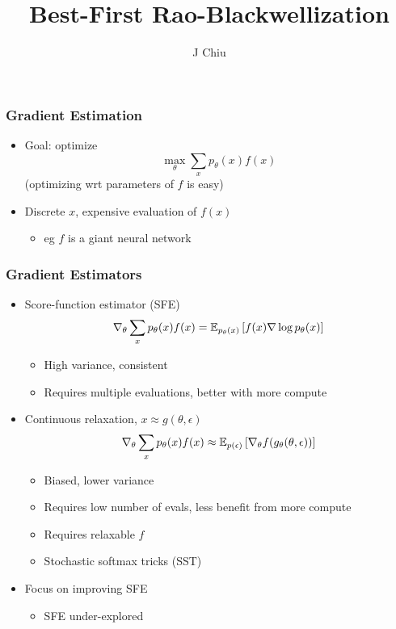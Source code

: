\documentclass{beamer}
\title{Best-First Rao-Blackwellization}
\author{J Chiu}
\begin{document}
\begin{frame}[plain]
\titlepage
\end{frame}

\begin{frame}
\frametitle{Gradient Estimation}
\begin{itemize}
\item Goal: optimize
$$\max_\theta \sum_x p_\theta(x)f(x)$$
(optimizing wrt parameters of $f$ is easy)
\item Discrete $x$, expensive evaluation of $f(x)$
    \begin{itemize}
    \item eg $f$ is a giant neural network
    \end{itemize}
\end{itemize}
\end{frame}

\begin{frame}
\frametitle{Gradient Estimators}
\begin{itemize}
\item Score-function estimator (SFE)
    $$\nabla_\theta \sum_x p_\theta(x)f(x)
    = \mathbb{E}_{p_\theta(x)}\left[f(x)\nabla \log p_\theta(x)\right]$$
    \begin{itemize}
    \item High variance, consistent
    \item Requires multiple evaluations, better with more compute
    \end{itemize}
\item Continuous relaxation, $x \approx g(\theta, \epsilon)$
    $$\nabla_\theta \sum_x p_\theta(x)f(x)
    \approx \mathbb{E}_{p(\epsilon)}\left[\nabla_\theta f(g_\theta(\theta, \epsilon))\right]$$
    \begin{itemize}
    \item Biased, lower variance
    \item Requires low number of evals, less benefit from more compute
    \item Requires relaxable $f$
    \item Stochastic softmax tricks (SST)
    \end{itemize}
\item Focus on improving SFE
    \begin{itemize}
    \item SFE under-explored
    \end{itemize}
\end{itemize}
\end{frame}
\end{document}
